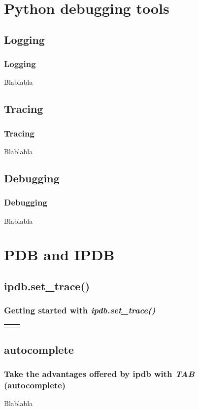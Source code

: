 \section{Python debugging tools}

\subsection{Logging}
\begin{frame}
\frametitle{Logging}	
Blablabla
\end{frame}

\subsection{Tracing}
\begin{frame}
\frametitle{Tracing}	
Blablabla
\end{frame}

\subsection{Debugging}
\begin{frame}
\frametitle{Debugging}	
Blablabla
\end{frame}





\section{PDB and IPDB}

\subsection{ipdb.set\_trace()}
\begin{frame}
\frametitle{Getting started with \textit{\textbf{ipdb.set\_trace()}}}
\begin{table}
\begin{tabular}{p{4.7cm}p{4.7cm}}
    &
    \lstset{basicstyle=\ttfamily\tiny}
    
\end{tabular} 
\end{table}
\end{frame}

\subsection{autocomplete}
\begin{frame}
\frametitle{Take the advantages offered by ipdb with \textit{\textbf{TAB}} (autocomplete)}
Blablabla
\end{frame}

